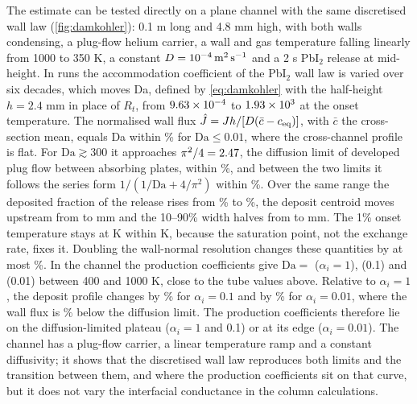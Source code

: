 The estimate can be tested directly on a plane channel with the same
discretised wall law (\cref{fig:damkohler}): 0.1 m long and 4.8 mm
high, with both walls condensing, a plug-flow helium carrier, a wall
and gas temperature falling linearly from 1000 to 350 K, a constant
$D=10^{-4}\,\mathrm{m^2\,s^{-1}}$ and a 2 s PbI$_2$ release at mid-height.
In \DaRuns{} runs the accommodation coefficient of the PbI$_2$ wall
law is varied over six decades, which moves Da, defined by
\cref{eq:damkohler} with the half-height $h=2.4$ mm in place of $R_t$,
from $9.63\times10^{-4}$ to $1.93\times10^{3}$ at the onset temperature. The normalised wall
flux $\hat J=Jh/[D(\bar c-c_{\rm eq})]$, with $\bar c$ the
cross-section mean, equals Da within \DaKinDev\% for
$\mathrm{Da}\le0.01$, where the cross-channel profile is flat. For
$\mathrm{Da}\gtrsim300$ it approaches $\pi^2/4=2.47$, the
diffusion limit of developed plug flow between absorbing plates, within
\DaDiffDev\%, and between the two limits it follows the series form
$1/(1/\mathrm{Da}+4/\pi^2)$ within \DaSeriesDev\%. Over the same range
the deposited fraction of the release rises from \DaCaptureLow\% to
\DaCaptureHigh\%, the deposit centroid moves upstream from
\DaCentroidLow{} to \DaCentroidHigh{} mm and the 10--90\% width halves
from \DaWidthLow{} to \DaWidthHigh{} mm. The 1\% onset temperature stays
at \DaOnset{} K within \DaOnsetSpread{} K, because the saturation point,
not the exchange rate, fixes it. Doubling the wall-normal resolution
changes these quantities by at most \DaRefine\%. In the channel the
production coefficients give $\mathrm{Da}={}$\DaChannelOne{} ($\alpha_i=1$),
\DaChannelTwo{} (0.1) and \DaChannelThree{} (0.01) between 400 and
1000 K, close to the tube values above. Relative to $\alpha_i=1$, the
deposit profile changes by \DaProfOne\% for $\alpha_i=0.1$ and by
\DaProfTwo\% for $\alpha_i=0.01$, where the wall flux is \DaFluxDeficit\%
below the diffusion limit. The production coefficients therefore lie on
the diffusion-limited plateau ($\alpha_i=1$ and 0.1) or at its edge
($\alpha_i=0.01$). The channel has a plug-flow carrier, a linear
temperature ramp and a constant diffusivity; it shows that the
discretised wall law reproduces both limits and the transition between
them, and where the production coefficients sit on that curve, but it
does not vary the interfacial conductance in the column calculations.
